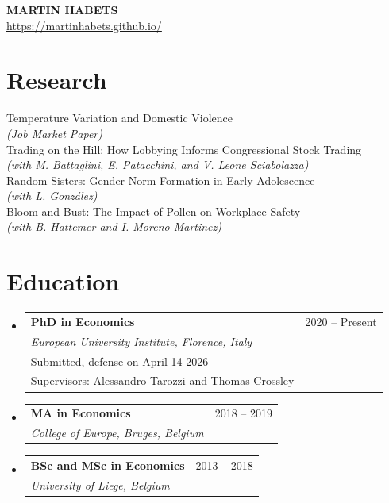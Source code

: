 \documentclass[12pt, a4paper]{article}
\makeatletter
\newcommand{\CVSubheading}[4]{
  \vspace{-2pt}\item
    \begin{tabular*}{0.97\textwidth}[t]{l@{\extracolsep{\fill}}r}
      \textbf{#1} & #2 \\
      \small#3 & \small #4 \\
    \end{tabular*}\vspace{-7pt}
}
\newcommand{\CVSubHeadingListStart}{\begin{itemize}[leftmargin=0.5cm, label={}]}
\newcommand{\CVSubHeadingListEnd}{\end{itemize}}
\makeatother
\begin{document}

\begin{center}
    \textbf{\Large \textbf{MARTIN HABETS}} \\ \vspace{2pt} %
    \href{https://martinhabets.github.io/}{https://martinhabets.github.io/} \
\end{center}



\section{Research}
 \begin{itemize}[leftmargin=0.5cm, label={}]
    \small{\item{
    	Temperature Variation and Domestic Violence\\
	\textit{(Job Market Paper)}\\
	\vspace{.2cm}
	Trading on the Hill: How Lobbying Informs Congressional Stock Trading \\
	\textit{(with M. Battaglini, E. Patacchini, and V. Leone Sciabolazza)} \\
	\vspace{.2cm} 
	Random Sisters: Gender-Norm Formation in Early Adolescence \\
	\textit{(with L. González)}\\
	\vspace{.2cm}
	Bloom and Bust: The Impact of Pollen on Workplace Safety \\
	\textit{(with B. Hattemer and I. Moreno-Martinez)}\\
    }}
 \end{itemize}
 
 
\section{Education}
  \CVSubHeadingListStart
    \CVSubheading
      {PhD in Economics}{2020 -- Present}
      {\emph{European University Institute, Florence, Italy} \\
      \quad Submitted, defense on April 14 2026 \\
	\quad Supervisors: Alessandro Tarozzi and Thomas Crossley
      }{}
    \CVSubheading
      {MA in Economics}{2018 -- 2019}
      {\emph{College of Europe, Bruges, Belgium}}{}
    \CVSubheading
      {BSc and MSc in Economics}{2013 -- 2018}
      {\emph{University of Liege, Belgium}}{}
  \CVSubHeadingListEnd
  
\end{document}
